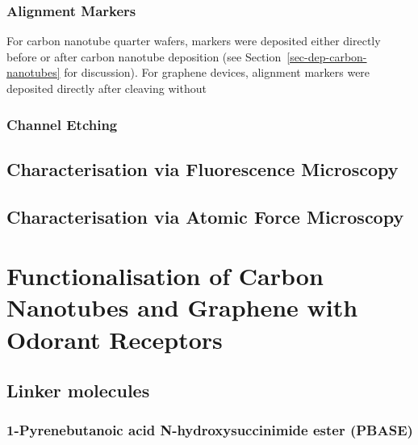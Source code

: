\documentclass[
  a4paper,
]{scrbook}
\begin{document}
\hypertarget{alignment-markers}{%
\subsection{Alignment Markers}\label{alignment-markers}}

For carbon nanotube quarter wafers, markers were deposited either
directly before or after carbon nanotube deposition (see
Section~\ref{sec-dep-carbon-nanotubes} for discussion). For graphene
devices, alignment markers were deposited directly after cleaving
without

\hypertarget{channel-etching}{%
\subsection{Channel Etching}\label{channel-etching}}

\hypertarget{sec-fluorescence-characterisation}{%
\section{Characterisation via Fluorescence
Microscopy}\label{sec-fluorescence-characterisation}}

\hypertarget{sec-AFM-characterisation}{%
\section{Characterisation via Atomic Force
Microscopy}\label{sec-AFM-characterisation}}


\hypertarget{functionalisation-of-carbon-nanotubes-and-graphene-with-odorant-receptors}{%
\chapter{Functionalisation of Carbon Nanotubes and Graphene with Odorant
Receptors}\label{functionalisation-of-carbon-nanotubes-and-graphene-with-odorant-receptors}}

\hypertarget{linker-molecules}{%
\section{Linker molecules}\label{linker-molecules}}

\hypertarget{pyrenebutanoic-acid-n-hydroxysuccinimide-ester-pbase}{%
\subsection{1-Pyrenebutanoic acid N-hydroxysuccinimide ester
(PBASE)}\label{pyrenebutanoic-acid-n-hydroxysuccinimide-ester-pbase}}
\end{document}
